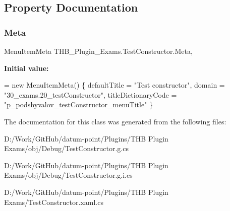 \subsection{Property Documentation}
\mbox{\label{class_t_h_b___plugin___exams_1_1_test_constructor_a85cefaa72576228ed78d6c8702efcc1d}} 
\subsubsection{\texorpdfstring{Meta}{Meta}}
{\footnotesize\ttfamily Menu\+Item\+Meta T\+H\+B\+\_\+\+Plugin\+\_\+\+Exams.\+Test\+Constructor.\+Meta\hspace{0.3cm}{\ttfamily [get]}, {\ttfamily [set]}}

{\bfseries Initial value\+:}
\begin{DoxyCode}
= \textcolor{keyword}{new} MenuItemMeta() \{
            defaultTitle = \textcolor{stringliteral}{"Test constructor"},
            domain = \textcolor{stringliteral}{"30\_exams.20\_testConstructor"},
            titleDictionaryCode = \textcolor{stringliteral}{"p\_podshyvalov\_testConstructor\_menuTitle"} \}
\end{DoxyCode}


The documentation for this class was generated from the following files\+:\begin{DoxyCompactItemize}
\item 
D\+:/\+Work/\+Git\+Hub/datum-\/point/\+Plugins/\+T\+H\+B Plugin Exams/obj/\+Debug/Test\+Constructor.\+g.\+cs\item 
D\+:/\+Work/\+Git\+Hub/datum-\/point/\+Plugins/\+T\+H\+B Plugin Exams/obj/\+Debug/Test\+Constructor.\+g.\+i.\+cs\item 
D\+:/\+Work/\+Git\+Hub/datum-\/point/\+Plugins/\+T\+H\+B Plugin Exams/Test\+Constructor.\+xaml.\+cs\end{DoxyCompactItemize}
